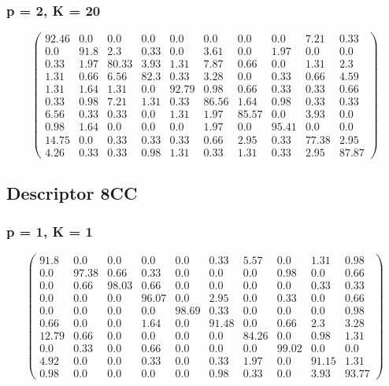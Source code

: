 \begin{appendices}
\subsubsection*{p = 2, K = 20}
$$\begin{pmatrix}
92.46&0.0&0.0&0.0&0.0&0.0&0.0&0.0&7.21&0.33\\
0.0&91.8&2.3&0.33&0.0&3.61&0.0&1.97&0.0&0.0\\
0.33&1.97&80.33&3.93&1.31&7.87&0.66&0.0&1.31&2.3\\
1.31&0.66&6.56&82.3&0.33&3.28&0.0&0.33&0.66&4.59\\
1.31&1.64&1.31&0.0&92.79&0.98&0.66&0.33&0.33&0.66\\
0.33&0.98&7.21&1.31&0.33&86.56&1.64&0.98&0.33&0.33\\
6.56&0.33&0.33&0.0&1.31&1.97&85.57&0.0&3.93&0.0\\
0.98&1.64&0.0&0.0&0.0&1.97&0.0&95.41&0.0&0.0\\
14.75&0.0&0.33&0.33&0.33&0.66&2.95&0.33&77.38&2.95\\
4.26&0.33&0.33&0.98&1.31&0.33&1.31&0.33&2.95&87.87
\end{pmatrix}$$

\subsection{Descriptor 8CC}
\subsubsection*{p = 1, K = 1}
$$\begin{pmatrix}
91.8&0.0&0.0&0.0&0.0&0.33&5.57&0.0&1.31&0.98\\
0.0&97.38&0.66&0.33&0.0&0.0&0.0&0.98&0.0&0.66\\
0.0&0.66&98.03&0.66&0.0&0.0&0.0&0.0&0.33&0.33\\
0.0&0.0&0.0&96.07&0.0&2.95&0.0&0.33&0.0&0.66\\
0.0&0.0&0.0&0.0&98.69&0.33&0.0&0.0&0.0&0.98\\
0.66&0.0&0.0&1.64&0.0&91.48&0.0&0.66&2.3&3.28\\
12.79&0.66&0.0&0.0&0.0&0.0&84.26&0.0&0.98&1.31\\
0.0&0.33&0.0&0.66&0.0&0.0&0.0&99.02&0.0&0.0\\
4.92&0.0&0.0&0.33&0.0&0.33&1.97&0.0&91.15&1.31\\
0.98&0.0&0.0&0.0&0.0&0.98&0.33&0.0&3.93&93.77
\end{pmatrix}$$


\end{appendices}
